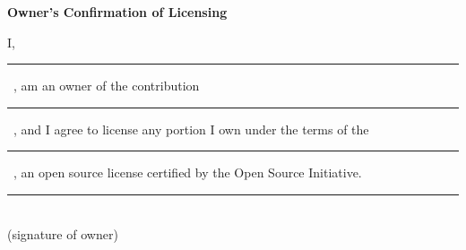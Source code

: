 \documentclass[12pt]{article}
\begin{document}
\begin{lrbox}{\tmpbox}
\begin{minipage}{.9\linewidth}
\begin{center}
\textbf{Owner's Confirmation of Licensing}
\end{center}
I, \rule{.5\linewidth}{.5pt}\ , am an owner of the contribution
\rule{.5\linewidth}{.5pt}\ , and I agree to license any portion I own
under
the terms of the \rule{.55\linewidth}{.5pt}\ , an open source license certified
by the Open Source Initiative.
\begin{flushleft}
\begin{minipage}{.6\linewidth}\centering\vspace{2\baselineskip}
\rule{\linewidth}{.5pt} \\
(signature of owner)
\end{minipage}
\end{flushleft}
\end{minipage}
\end{lrbox}

\vspace*{5\baselineskip}
\bgroup\setlength{\fboxsep}{1em}
\fbox{\usebox{\tmpbox}}
\egroup
\end{document}
